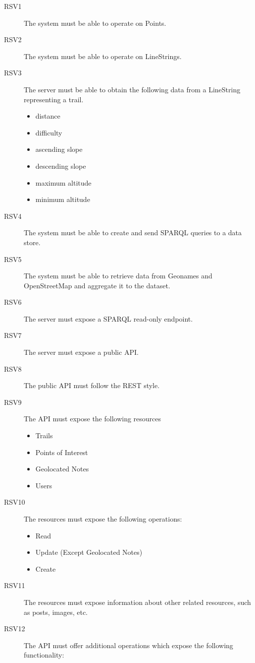 \begin{description}
\item[RSV1] The system must be able to operate on Points.
\item[RSV2] The system must be able to operate on LineStrings.
\item[RSV3] The server must be able to obtain the following data from a LineString representing a trail.
 \begin{itemize}
 \item distance
 \item difficulty
 \item ascending slope
 \item descending slope
 \item maximum altitude
 \item minimum altitude
 \end{itemize}
\item[RSV4] The system must be able to create and send SPARQL queries to a data store.
\item[RSV5] The system must be able to retrieve data from Geonames and OpenStreetMap and aggregate it to the dataset.
\item[RSV6] The server must expose a SPARQL read-only endpoint.
\item[RSV7] The server must expose a public API.
\item[RSV8] The public API must follow the REST style.
\item[RSV9] The API must expose the following resources
  \begin{itemize}
  \item Trails
  \item Points of Interest
  \item Geolocated Notes
  \item Users
  \end{itemize}
\item[RSV10] The resources must expose the following operations:
  \begin{itemize}
  \item Read
  \item Update (Except Geolocated Notes)
  \item Create
  \end{itemize}
\item[RSV11] The resources must expose information about other related resources, such as posts, images, etc.
\item[RSV12] The API must offer additional operations which expose the following functionality:

\end{description}
